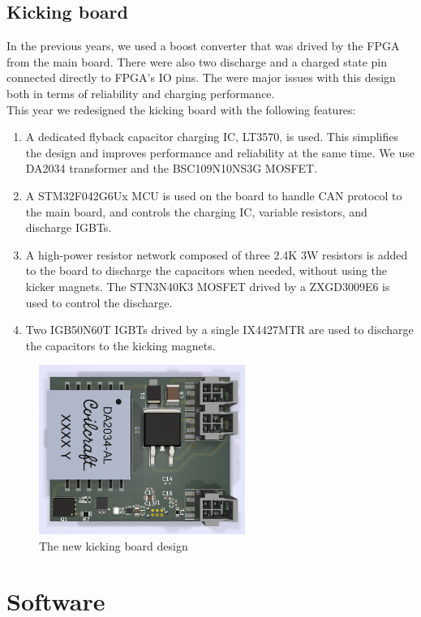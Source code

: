 \documentclass[runningheads]{llncs}
\begin{document}
\subsection{Kicking board}
In the previous years, we used a boost converter that was drived by the FPGA from the main board. There were also two discharge and a charged state pin connected directly to FPGA's IO pins. The were major issues with this design both in terms of reliability and charging performance.\\
This year we redesigned the kicking board with the following features:
\begin{enumerate}
    \item A dedicated flyback capacitor charging IC, LT3570, is used. This simplifies the design and improves performance and reliability at the same time. We use DA2034 transformer and the BSC109N10NS3G MOSFET.
    \item A STM32F042G6Ux MCU is used on the board to handle CAN protocol to the main board, and controls the charging IC, variable resistors, and discharge IGBTs.
    \item A high-power resistor network composed of three 2.4K 3W resistors is added to the board to discharge the capacitors when needed, without using the kicker magnets. The STN3N40K3 MOSFET drived by a ZXGD3009E6 is used to control the discharge.
    \item Two IGB50N60T IGBTs drived by a single IX4427MTR are used to discharge the capacitors to the kicking magnets. 
\end{enumerate}

\begin{figure}
	\centering
	\includegraphics[width=0.6\textwidth]{images/mikona.png}
	\caption{The new kicking board design}
	\label{fig:MIKONA}
\end{figure}


\section{Software}
\end{document}
